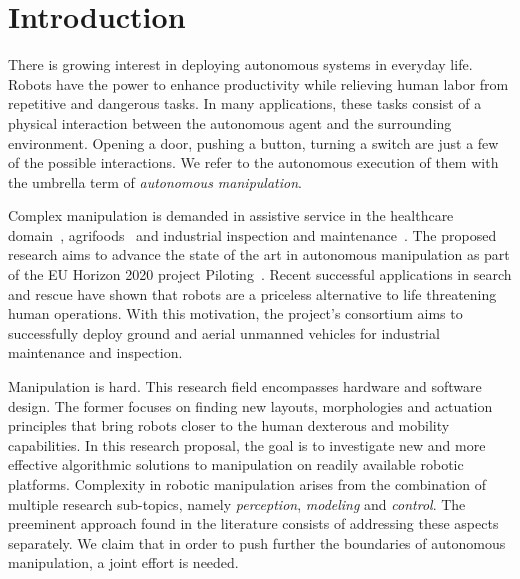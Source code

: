 \section{Introduction}
\label{sec:Introduction}



There is growing interest in deploying autonomous systems in everyday life. Robots have the power to enhance productivity while relieving human labor from repetitive and dangerous tasks. In many applications, these tasks consist of a physical interaction between the autonomous agent and the surrounding environment. Opening a door, pushing a button, turning a switch are just a few of the possible interactions. We refer to the autonomous execution of them with the umbrella term of \emph{autonomous manipulation}.

Complex manipulation is demanded in assistive service in the healthcare domain~\cite{cooper2020ari}, agrifoods~\cite{duckett2018agricultural} and industrial inspection and maintenance~\cite{lattanzi2017review}. The proposed research aims to advance the state of the art in autonomous manipulation as part of the EU Horizon 2020 project Piloting~\cite{eu-piloting-2020}. Recent successful applications in search and rescue have shown that robots are a priceless alternative to life threatening human operations. With this motivation, the project's consortium aims to successfully deploy ground and aerial unmanned vehicles for industrial maintenance and inspection. 


Manipulation is hard. This research field encompasses hardware and software design. The former focuses on finding new layouts, morphologies and actuation principles that bring robots closer to the human dexterous and mobility capabilities. In this research proposal, the goal is to investigate new and more effective algorithmic solutions to manipulation on readily available robotic platforms. Complexity in robotic manipulation arises from the combination of multiple research sub-topics, namely \emph{perception}, \emph{modeling} and \emph{control}. The preeminent approach found in the literature consists of addressing these aspects separately. We claim that in order to push further the boundaries of autonomous manipulation, a joint effort is needed. 

